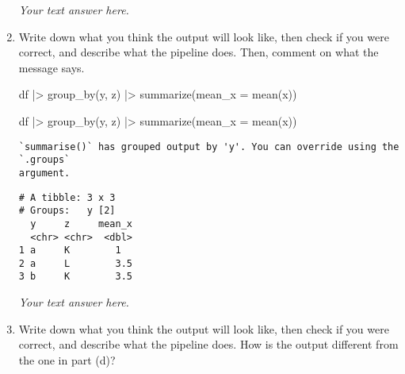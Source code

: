 \documentclass[
  letterpaper,
  DIV=11,
  numbers=noendperiod]{scrreprt}
\newenvironment{Shaded}{\begin{snugshade}}{\end{snugshade}}
\newcommand{\AttributeTok}[1]{\textcolor[rgb]{0.40,0.45,0.13}{#1}}
\newcommand{\FunctionTok}[1]{\textcolor[rgb]{0.28,0.35,0.67}{#1}}
\newcommand{\NormalTok}[1]{\textcolor[rgb]{0.00,0.23,0.31}{#1}}
\newcommand{\SpecialCharTok}[1]{\textcolor[rgb]{0.37,0.37,0.37}{#1}}
\begin{document}
\begin{enumerate}
\begin{tcolorbox}
  \emph{Your text answer here.}

  \end{tcolorbox}
\item
  Write down what you think the output will look like, then check if you
  were correct, and describe what the pipeline does. Then, comment on
  what the message says.

\begin{Shaded}
\begin{Highlighting}[]
\NormalTok{df }\SpecialCharTok{|\textgreater{}}
  \FunctionTok{group\_by}\NormalTok{(y, z) }\SpecialCharTok{|\textgreater{}}
  \FunctionTok{summarize}\NormalTok{(}\AttributeTok{mean\_x =} \FunctionTok{mean}\NormalTok{(x))}
\end{Highlighting}
\end{Shaded}

  \begin{tcolorbox}[enhanced jigsaw, breakable, bottomtitle=1mm, left=2mm, colback=white, toprule=.15mm, leftrule=.75mm, colframe=quarto-callout-note-color-frame, colbacktitle=quarto-callout-note-color!10!white, title={Answer}, coltitle=black, toptitle=1mm, bottomrule=.15mm, opacitybacktitle=0.6, arc=.35mm, rightrule=.15mm, titlerule=0mm, opacityback=0]

\begin{Shaded}
\begin{Highlighting}[]
\NormalTok{df }\SpecialCharTok{|\textgreater{}}
  \FunctionTok{group\_by}\NormalTok{(y, z) }\SpecialCharTok{|\textgreater{}}
  \FunctionTok{summarize}\NormalTok{(}\AttributeTok{mean\_x =} \FunctionTok{mean}\NormalTok{(x))}
\end{Highlighting}
\end{Shaded}

\begin{verbatim}
`summarise()` has grouped output by 'y'. You can override using the `.groups`
argument.
\end{verbatim}

\begin{verbatim}
# A tibble: 3 x 3
# Groups:   y [2]
  y     z     mean_x
  <chr> <chr>  <dbl>
1 a     K        1  
2 a     L        3.5
3 b     K        3.5
\end{verbatim}

  \emph{Your text answer here.}

  \end{tcolorbox}
\item
  Write down what you think the output will look like, then check if you
  were correct, and describe what the pipeline does. How is the output
  different from the one in part (d)?


\end{enumerate}
\end{document}
